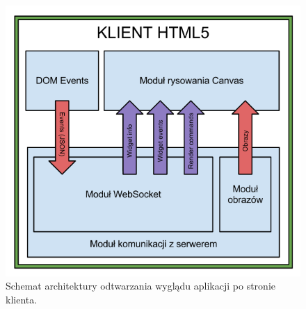 
\begin{figure}
\centering
\includegraphics[width=0.8\linewidth]{img/arch-render}
\caption{Schemat architektury odtwarzania wyglądu aplikacji po stronie klienta.}
\label{fig:arch-render}
\end{figure}
